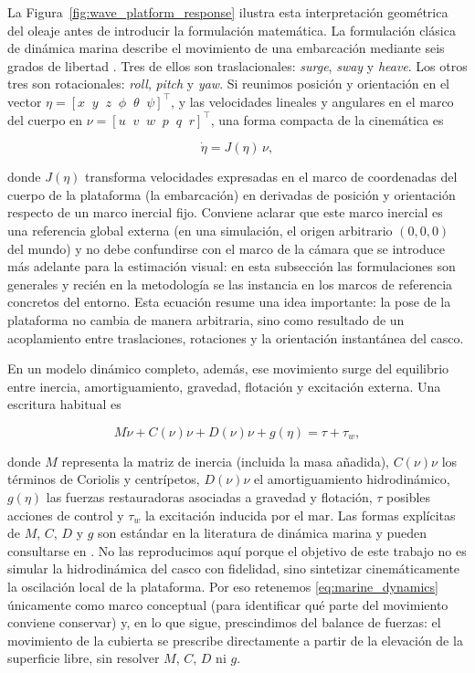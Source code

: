 \documentclass[12pt,a4paper]{report}
\begin{document}
La Figura~\ref{fig:wave_platform_response} ilustra esta interpretación
geométrica del oleaje antes de introducir la formulación matemática.
La formulación clásica de dinámica marina describe el movimiento de una
embarcación mediante seis grados de libertad \citep{Fossen1995}. Tres de ellos
son traslacionales: \emph{surge}, \emph{sway} y \emph{heave}. Los otros tres
son rotacionales: \emph{roll}, \emph{pitch} y \emph{yaw}. Si reunimos posición
y orientación en el vector
\(\eta = [x \;\; y \;\; z \;\; \phi \;\; \theta \;\; \psi]^\top\), y las
velocidades lineales y angulares en el marco del cuerpo en
\(\nu = [u \;\; v \;\; w \;\; p \;\; q \;\; r]^\top\), una forma compacta de la
cinemática es

\begin{equation}
\dot{\eta} = J(\eta)\,\nu,
\label{eq:marine_kinematics}
\end{equation}

donde \(J(\eta)\) transforma velocidades expresadas en el marco de coordenadas
del cuerpo de la plataforma (la embarcación) en derivadas de posición y
orientación respecto de un marco inercial fijo. Conviene aclarar que este marco
inercial es una referencia global externa (en una simulación, el origen
arbitrario \((0,0,0)\) del mundo) y no debe confundirse con el marco de la
cámara que se introduce más adelante para la estimación visual: en esta
subsección las formulaciones son generales y recién en la metodología se las
instancia en los marcos de referencia concretos del entorno. Esta ecuación
resume una idea importante: la pose de la plataforma no cambia de manera
arbitraria, sino como resultado de un acoplamiento entre traslaciones,
rotaciones y la orientación instantánea del casco.

En un modelo dinámico completo, además, ese movimiento surge del equilibrio
entre inercia, amortiguamiento, gravedad, flotación y excitación externa. Una
escritura habitual es

\begin{equation}
M \dot{\nu} + C(\nu)\nu + D(\nu)\nu + g(\eta) = \tau + \tau_w,
\label{eq:marine_dynamics}
\end{equation}

donde \(M\) representa la matriz de inercia (incluida la masa añadida),
\(C(\nu)\nu\) los términos de Coriolis y centrípetos, \(D(\nu)\nu\) el
amortiguamiento hidrodinámico, \(g(\eta)\) las fuerzas restauradoras asociadas a
gravedad y flotación, \(\tau\) posibles acciones de control y \(\tau_w\) la
excitación inducida por el mar. Las formas explícitas de \(M\), \(C\), \(D\) y
\(g\) son estándar en la literatura de dinámica marina y pueden consultarse en
\citet{Fossen1995}. No las reproducimos aquí porque el objetivo de este trabajo
no es simular la hidrodinámica del casco con fidelidad, sino sintetizar
cinemáticamente la oscilación local de la plataforma. Por eso retenemos
\eqref{eq:marine_dynamics} únicamente como marco conceptual (para identificar qué
parte del movimiento conviene conservar) y, en lo que sigue, prescindimos del
balance de fuerzas: el movimiento de la cubierta se prescribe directamente a
partir de la elevación de la superficie libre, sin resolver \(M\), \(C\), \(D\)
ni \(g\).
\end{document}
